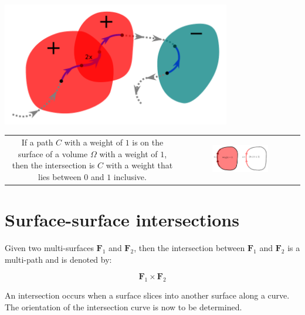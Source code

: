 \begin{center}
\includegraphics[width = 0.75\textwidth]{Intersections/Path-volume_intersections/path_volume_intersections_example_3}
\end{center}


\begin{tabular}{cc}
\parbox{0.5\textwidth}{
If a path \(C\) with a weight of \(1\) is on the surface of a volume \(\Omega\) with a weight of \(1\), then the intersection is \(C\) with a weight that lies between \(0\) and \(1\) inclusive.
} & \parbox{0.5\textwidth}{
\includegraphics[width = 0.5\textwidth]{Intersections/Path-volume_intersections/path_volume_intersection_boundary_case}
}
\end{tabular}






\section{Surface-surface intersections}

Given two multi-surfaces \(\mathbf{F}_1\) and \(\mathbf{F}_2\), then the intersection between \(\mathbf{F}_1\) and \(\mathbf{F}_2\) is a multi-path and is denoted by:

\[\mathbf{F}_1 \times \mathbf{F}_2\]

An intersection occurs when a surface slices into another surface along a curve. The orientation of the intersection curve is now to be determined. 

